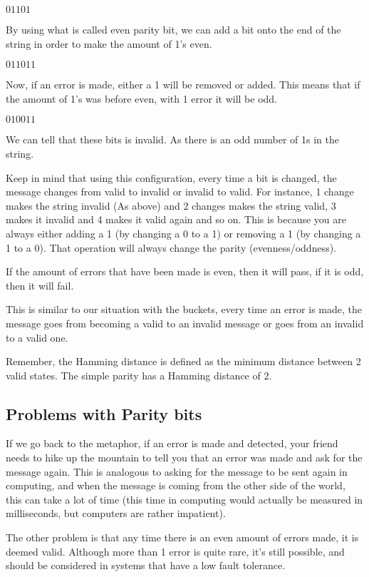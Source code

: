 \documentclass{article}
\begin{document}
  $01101$

  By using what is called even parity bit, we can add a bit onto the end of the string in order to make the amount of 1's even.

  $011011$

  Now, if an error is made, either a 1 will be removed or added. This means that if the amount of 1's was before even, with 1 error it will be odd.

  $010011$

  We can tell that these bits is invalid. As there is an odd number of 1s in the string.

  Keep in mind that using this configuration, every time a bit is changed, the message changes from valid to invalid or invalid to valid. For instance, 1 change makes the string invalid (As above) and 2 changes makes the string valid, 3 makes it invalid and 4 makes it valid again and so on. This is because you are always either adding a 1 (by changing a 0 to a 1) or removing a 1 (by changing a 1 to a 0). That operation will always change the parity (evenness/oddness).

  If the amount of errors that have been made is even, then it will pass, if it is odd, then it will fail.

  This is similar to our situation with the buckets, every time an error is made, the message goes from becoming a valid to an invalid message or goes from an invalid to a valid one.

  Remember, the Hamming distance is defined as the minimum distance between 2 valid states. The simple parity has a Hamming distance of 2.

  \subsection*{Problems with Parity bits}
  If we go back to the metaphor, if an error is made and detected, your friend needs to hike up the mountain to tell you that an error was made and ask for the message again. This is analogous to asking for the message to be sent again in computing, and when the message is coming from the other side of the world, this can take a lot of time (this time in computing would actually be measured in milliseconds, but computers are rather impatient).

  The other problem is that any time there is an even amount of errors made, it is deemed valid. Although more than 1 error is quite rare, it's still possible, and should be considered in systems that have a low fault tolerance.
\end{document}
